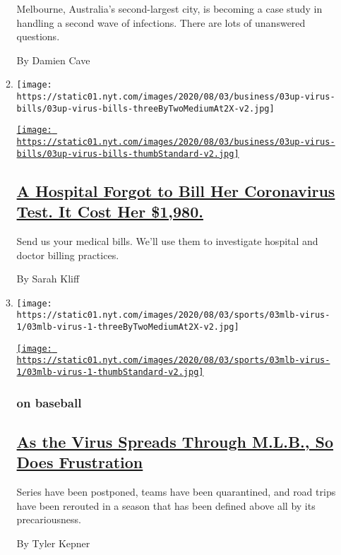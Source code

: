 \begin{enumerate}
\begin{enumerate}
    Melbourne, Australia's second-largest city, is becoming a case study
    in handling a second wave of infections. There are lots of
    unanswered questions.

    By Damien Cave
  \item
    \texttt{[image: https://static01.nyt.com/images/2020/08/03/business/03up-virus-bills/03up-virus-bills-threeByTwoMediumAt2X-v2.jpg]}

    \href{/2020/08/03/upshot/nj-coronavirus-medical-bill.html}{\texttt{[image: https://static01.nyt.com/images/2020/08/03/business/03up-virus-bills/03up-virus-bills-thumbStandard-v2.jpg]}}

    \hypertarget{a-hospital-forgot-to-bill-her-coronavirus-test-it-cost-her-1980}{%
    \subsection{\texorpdfstring{\href{/2020/08/03/upshot/nj-coronavirus-medical-bill.html}{A
    Hospital Forgot to Bill Her Coronavirus Test. It Cost Her
    \$1,980.}}{A Hospital Forgot to Bill Her Coronavirus Test. It Cost Her \$1,980.}}\label{a-hospital-forgot-to-bill-her-coronavirus-test-it-cost-her-1980}}

    Send us your medical bills. We'll use them to investigate hospital
    and doctor billing practices.

    By Sarah Kliff
  \item
    \texttt{[image: https://static01.nyt.com/images/2020/08/03/sports/03mlb-virus-1/03mlb-virus-1-threeByTwoMediumAt2X-v2.jpg]}

    \href{/2020/08/03/sports/baseball/mlb-coronavirus-outbreak.html}{\texttt{[image: https://static01.nyt.com/images/2020/08/03/sports/03mlb-virus-1/03mlb-virus-1-thumbStandard-v2.jpg]}}

    \hypertarget{on-baseball}{%
    \subsubsection{on baseball}\label{on-baseball}}

    \hypertarget{as-the-virus-spreads-through-mlb-so-does-frustration}{%
    \subsection{\texorpdfstring{\href{/2020/08/03/sports/baseball/mlb-coronavirus-outbreak.html}{As
    the Virus Spreads Through M.L.B., So Does
    Frustration}}{As the Virus Spreads Through M.L.B., So Does Frustration}}\label{as-the-virus-spreads-through-mlb-so-does-frustration}}

    Series have been postponed, teams have been quarantined, and road
    trips have been rerouted in a season that has been defined above all
    by its precariousness.

    By Tyler Kepner
  \end{enumerate}
\end{enumerate}

